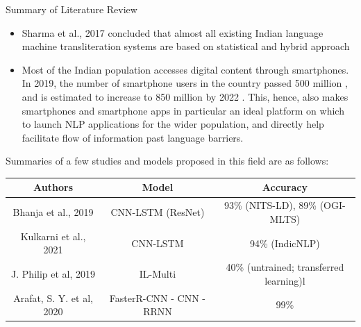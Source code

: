 \documentclass{beamer}
\begin{document}
\begin{frame}[allowframebreaks]{Summary of Literature Review}
\begin{itemize}
		\item  Sharma et al., 2017 concluded that almost all  existing Indian language machine transliteration systems are based on statistical and hybrid approach \cite{sharma2017machine}
		\item Most of the Indian population accesses digital content through smartphones. In 2019, the number of smartphone users in the country passed 500 million \cite{news18_2020}, and is estimated to increase to 850 million by 2022 \cite{www.ettelecom.com_2020}. This, hence, also makes smartphones and smartphone apps in particular an ideal platform on which to launch NLP applications for the wider population, and directly help facilitate flow of information past language barriers.
\end{itemize}
Summaries of a few studies and models proposed in this field are as follows:
\begin{scriptsize}
	\begin{tabular}{ |c | c | c | }
	\hline
		\textbf{Authors} & \textbf{Model} & \textbf{Accuracy} \\
	\hline
		Bhanja et al., 2019 \cite{bhanja2019deep} & CNN-LSTM (ResNet) & 93\% (NITS-LD), 89\% (OGI-MLTS) \\
	\hline
		Kulkarni et al., 2021 \cite{kulkarni2021experimental} & CNN-LSTM &  94\% (IndicNLP)\\
	\hline
		J. Philip et al, 2019 \cite{philip2019baseline} & IL-Multi & 40\% (untrained; transferred learning)l \\
	\hline
		Arafat, S. Y. et al, 2020 \cite{arafat2020urdu}  & FasterR-CNN - CNN - RRNN & 99\% \\
	\hline
	\end{tabular}
\end{scriptsize}
\end{frame}
\end{document}
